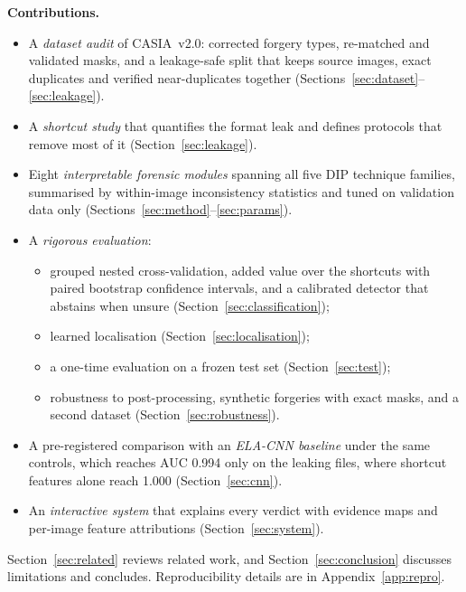 \textbf{Contributions.}
\begin{itemize}\setlength\itemsep{0pt}
\item A \emph{dataset audit} of CASIA~v2.0: corrected forgery types, re-matched and validated masks, and a
leakage-safe split that keeps source images, exact duplicates and verified near-duplicates together
(Sections~\ref{sec:dataset}--\ref{sec:leakage}).
\item A \emph{shortcut study} that quantifies the format leak and defines protocols that remove most of it
(Section~\ref{sec:leakage}).
\item Eight \emph{interpretable forensic modules} spanning all five DIP technique families, summarised by
within-image inconsistency statistics and tuned on validation data only (Sections~\ref{sec:method}--\ref{sec:params}).
\item A \emph{rigorous evaluation}:
  \begin{itemize}\setlength\itemsep{0pt}
  \item grouped nested cross-validation, added value over the shortcuts with paired bootstrap confidence intervals,
  and a calibrated detector that abstains when unsure (Section~\ref{sec:classification});
  \item learned localisation (Section~\ref{sec:localisation});
  \item a one-time evaluation on a frozen test set (Section~\ref{sec:test});
  \item robustness to post-processing, synthetic forgeries with exact masks, and a second dataset
  (Section~\ref{sec:robustness}).
  \end{itemize}
\item A pre-registered comparison with an \emph{ELA-CNN baseline} under the same controls, which reaches AUC 0.994 only
on the leaking files, where shortcut features alone reach 1.000 (Section~\ref{sec:cnn}).
\item An \emph{interactive system} that explains every verdict with evidence maps and per-image feature
attributions (Section~\ref{sec:system}).
\end{itemize}

Section~\ref{sec:related} reviews related work, and Section~\ref{sec:conclusion} discusses limitations and
concludes. Reproducibility details are in Appendix~\ref{app:repro}.

